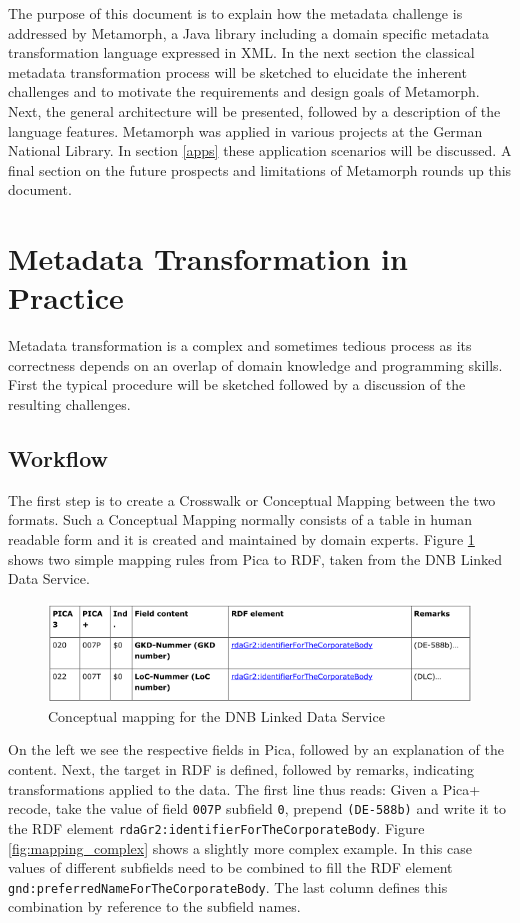 \documentclass[12pt,a4paper]{article}
\begin{document}
The purpose of this document is to explain how the metadata challenge is addressed by Metamorph, a Java library including a domain specific metadata transformation language expressed in XML. In the next section the classical metadata transformation process will be sketched to elucidate the inherent challenges and to motivate the requirements and design goals of Metamorph. Next, the general architecture will be presented, followed by a description of the language features. Metamorph was applied in various projects at the German National Library. In section \ref{apps} these application scenarios will be discussed.
A final section on the future prospects and limitations of Metamorph rounds up this document.


\section{Metadata Transformation in Practice}

Metadata transformation is a complex and sometimes tedious process as its correctness depends on an overlap of domain knowledge and programming skills. First the typical procedure will be sketched followed by a discussion of the resulting challenges.


\subsection{Workflow}

The first step is to create a Crosswalk or Conceptual Mapping between the two formats. Such a Conceptual Mapping normally consists of a table in human readable form and it is created and maintained by domain experts. Figure \ref{fig:mapping_simple} shows two simple mapping rules from Pica to RDF, taken from the DNB Linked Data Service. 

\begin{figure}[htp]
\centering
\includegraphics[width=.8\textwidth]{figures/mapping_simple}
\caption{Conceptual mapping for the DNB Linked Data Service}\label{fig:mapping_simple}
\end{figure}

On the left we see the respective fields in Pica, followed by an explanation of the content. Next, the target in RDF is defined, followed by remarks, indicating transformations applied to the data. The first line thus reads: Given a Pica+ recode, take the value of field {\tt 007P} subfield {\tt 0}, prepend {\tt (DE-588b)} and write it to the RDF element {\tt rdaGr2:identifierForTheCorporateBody}.  Figure \ref{fig:mapping_complex} shows a slightly more complex example. In this case values of different subfields need to be combined to fill the RDF element {\tt gnd:preferredNameForTheCorporateBody}. The last column defines this combination by reference to the subfield names.
\end{document}

